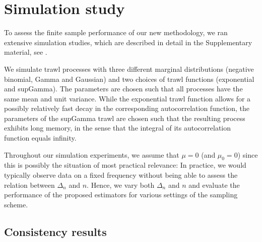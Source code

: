 \documentclass{article}
\theoremstyle{plain}
\theoremstyle{definition}
\theoremstyle{remark}
\begin{document}
\section{Simulation study}\label{sec:Sim} 
To assess the finite sample performance of our new methodology, we ran extensive simulation studies, which are described in detail in the Supplementary material, see \cite{SV2022-sup}. 



We simulate trawl processes with three different marginal distributions (negative binomial, Gamma and Gaussian) and two choices of trawl functions (exponential and supGamma). The parameters are chosen such that all processes have the same mean and unit variance. While the exponential trawl function allows for a possibly relatively fast decay in the corresponding autocorrelation function, the parameters of the supGamma trawl are chosen such that the resulting process exhibits long memory, in the sense that the integral of its autocorrelation function equals infinity.

Throughout our simulation experiments, we assume that $\mu=0$ (and $\mu_0=0$) since this is possibly the situation of most practical relevance: In practice, we would typically observe data on a fixed frequency without being able to assess the relation between $\Delta_n$ and $n$. Hence, we vary both $\Delta_n$ and $n$ and evaluate the performance of the proposed estimators for various settings of the sampling scheme. 

\subsection{Consistency results}
\end{document}
